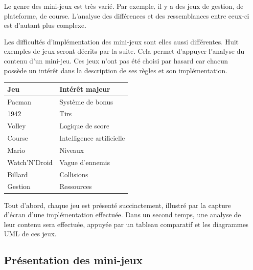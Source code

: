 
Le genre des mini-jeux est très varié. Par exemple, il y a des jeux de gestion, de plateforme, de course.
L'analyse des différences et des ressemblances entre ceux-ci est d'autant plus complexe.

Les difficultés d'implémentation des mini-jeux sont elles aussi différentes.
Huit exemples de jeux seront décrits par la suite.
Cela permet d'appuyer l'analyse du contenu d'un mini-jeu.
Ces jeux n'ont pas été choisi par hasard car chacun possède un intérêt dans la description de ses règles et son implémentation. 


\begin{center}
\begin{tabular}{l|l}
 Jeu & Intérêt majeur \\
 \hline
 Pacman & Système de bonus \\
 1942 & Tirs \\
 Volley & Logique de score \\
 Course & Intelligence artificielle \\
 Mario & Niveaux \\
 Watch'N'Droid & Vague d'ennemis \\
 Billard & Collisions \\
 Gestion & Ressources \\
\end{tabular}
\end{center}

\vspace{0.5cm}

Tout d'abord, chaque jeu est présenté succinctement, illustré par la capture d'écran d'une implémentation effectuée.
Dans un second temps, une analyse de leur contenu sera effectuée, appuyée par un tableau comparatif et les diagrammes UML de ces jeux.

\clearpage

\subsection{Présentation des mini-jeux}


